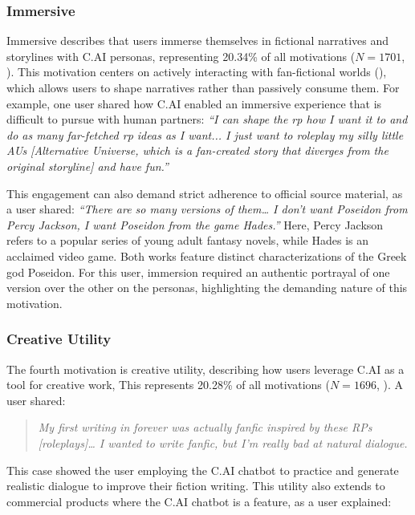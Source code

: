 \documentclass[sigconf, nonacm]{acmart}
\newcommand{\implications}[1]{{\color{black}{#1}}}
\newcommand{\newfinding}[1]{{\color{black}{#1}}}
\begin{document}
\subsubsection{Immersive \newfinding{Fanwork}}
\label{ImmersiveFandom}
Immersive \newfinding{fanwork} describes that users immerse themselves in fictional narratives and storylines with C.AI personas, representing 20.34\% of all motivations ($N=1701$, \implications{or 7.60\% of all posts}). This motivation centers on actively interacting with fan-fictional worlds (\implications{or fanon}), which allows users to shape narratives rather than passively consume them. For example, one user shared how C.AI enabled an immersive experience that is difficult to pursue with human partners: \textit{``I can shape the rp how I want it to and do as many far-fetched rp ideas as I want... I just want to roleplay my silly little AUs [Alternative Universe, which is a fan-created story that diverges from the original storyline] and have fun.''}

This engagement can also demand strict adherence to official source material, as a user shared: \textit{``There are so many versions of them… I don't want Poseidon from Percy Jackson, I want Poseidon from the game Hades.''}
Here, Percy Jackson refers to a popular series of young adult fantasy novels, while Hades is an acclaimed video game. Both works feature distinct characterizations of the Greek god Poseidon. For this user, immersion required an authentic portrayal of one version over the other on the personas, highlighting the demanding nature of this motivation.

\subsubsection{Creative Utility}
\label{CreativeUtility}
The fourth motivation is creative utility, describing how users leverage C.AI as a tool for creative work, \newfinding{such as developing storylines, practicing writing, or creating new characters of C.AI chatbots.} This represents 20.28\% of all motivations ($N=1696$, \implications{or 7.58\% of all posts}). A user shared:

\begin{quote}
    \textit{My first writing in forever was actually fanfic inspired by these RPs [roleplays]… I wanted to write fanfic, but I'm really bad at natural dialogue.}
\end{quote}

This case showed the user employing the C.AI chatbot to practice and generate realistic dialogue to improve their fiction writing. This utility also extends to commercial products where the C.AI chatbot is a feature, as a user explained:
\end{document}
